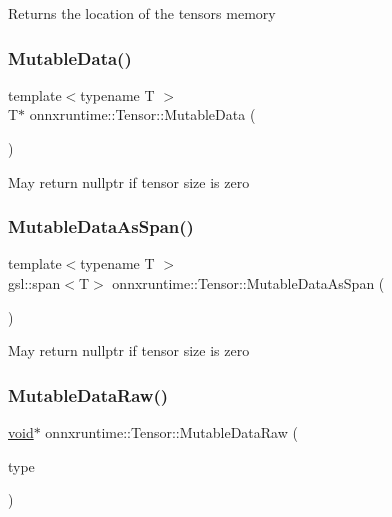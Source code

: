 Returns the location of the tensor\textquotesingle{}s memory \mbox{\label{classonnxruntime_1_1Tensor_ac0094e931dedd1e48956a28349f964a1}} 
\subsubsection{\texorpdfstring{Mutable\+Data()}{MutableData()}}
{\footnotesize\ttfamily template$<$typename T $>$ \\
T$\ast$ onnxruntime\+::\+Tensor\+::\+Mutable\+Data (\begin{DoxyParamCaption}{ }\end{DoxyParamCaption})\hspace{0.3cm}{\ttfamily [inline]}}

May return nullptr if tensor size is zero \mbox{\label{classonnxruntime_1_1Tensor_aefab328a8a7d23384d505dd52f5483a0}} 
\subsubsection{\texorpdfstring{Mutable\+Data\+As\+Span()}{MutableDataAsSpan()}}
{\footnotesize\ttfamily template$<$typename T $>$ \\
gsl\+::span$<$T$>$ onnxruntime\+::\+Tensor\+::\+Mutable\+Data\+As\+Span (\begin{DoxyParamCaption}{ }\end{DoxyParamCaption})\hspace{0.3cm}{\ttfamily [inline]}}

May return nullptr if tensor size is zero \mbox{\label{classonnxruntime_1_1Tensor_afa53b6e1fd63969007a84e5026073efe}} 
\subsubsection{\texorpdfstring{Mutable\+Data\+Raw()}{MutableDataRaw()}\hspace{0.1cm}{\footnotesize\ttfamily [1/2]}}
{\footnotesize\ttfamily \mbox{\hyperlink{mlasi_8h_a88f941d423cb2a819b70a1358982b1a6}{void}}$\ast$ onnxruntime\+::\+Tensor\+::\+Mutable\+Data\+Raw (\begin{DoxyParamCaption}\item[{\mbox{\hyperlink{namespaceonnxruntime_ad77d0a6e838ec7da5dc35fed5ee66b49}{M\+L\+Data\+Type}}}]{type }\end{DoxyParamCaption})\hspace{0.3cm}{\ttfamily [inline]}}

